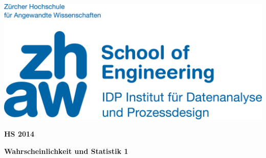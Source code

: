\noindent
\begin{minipage}[t]{0.4\textwidth} 
\includegraphics[width=\linewidth]{logo.jpg}
\end{minipage}%
\hfill%
\begin{minipage}[t]{0.4\textwidth}\raggedleft
\textbf{\large HS 2014}
\end{minipage}

\begin{center}
 \textbf{\large Wahrscheinlichkeit und Statistik 1} \\
 \vspace{0.3cm}
\end{center}
